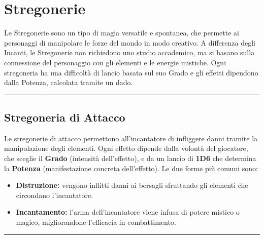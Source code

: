 \documentclass[./magie.tex]{subfiles}
\begin{document}
\section{Stregonerie}

Le Stregonerie sono un tipo di magia versatile e spontanea, che permette ai personaggi di manipolare le forze del mondo in modo creativo. A differenza degli Incanti, le Stregonerie non richiedono uno studio accademico, ma si basano sulla connessione del personaggio con gli elementi e le energie mistiche. Ogni stregoneria ha una difficoltà di lancio basata sul suo Grado e gli effetti dipendono dalla Potenza, calcolata tramite un dado.
\vspace{0.2cm}
\noindent
\begin{center}
\rule{\textwidth}{0.4pt} 
\end{center}
\vspace{0.2cm}
\subsection{Stregoneria di Attacco}

Le stregonerie di attacco permettono all’incantatore di infliggere danni tramite la manipolazione degli elementi. Ogni effetto dipende dalla volontà del giocatore, che sceglie il \textbf{Grado} (intensità dell'effetto), e da un lancio di \textbf{1D6} che determina la \textbf{Potenza} (manifestazione concreta dell’effetto). Le due forme più comuni sono:
\begin{itemize}
\item \textbf{Distruzione:} vengono inflitti danni ai bersagli sfruttando gli elementi che circondano l'incantatore.
\item \textbf{Incantamento:} l'arma dell'incantatore viene infusa di potere mistico o magico, migliorandone l'efficacia in combattimento.
\end{itemize}

\vspace{0.2cm}
\noindent
\begin{center}
\rule{\textwidth}{0.4pt} 
\end{center}
\vspace{0.2cm}
\clearpage
\end{document}
